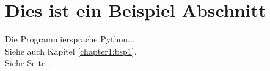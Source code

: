 \section{Dies ist ein Beispiel Abschnitt}



Die Programmiersprache Python... \cite{Pilgrim2009} \\

Siehe auch Kapitel \ref{chapter1:bsp1}. \\

Siehe Seite \pageref{chapter1:bsp1}.